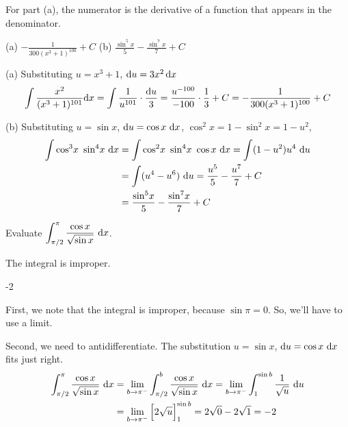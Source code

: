 \begin{hint}
For part (a), the numerator is the derivative of a function that appears
in the denominator.

\end{hint}

\begin{answer}
(a)
$\displaystyle-\frac{1}{300(x^3+1)^{100}} + C$
\qquad (b)
$\displaystyle\frac{\sin^5\!x}{5}-\frac{\sin^7\!x}{7}+C$

\end{answer}

\begin{solution}
(a)
Substituting $u=x^3+1$, $\mathrm{d}u=3x^2\,\mathrm{d}x$
\begin{equation*}
\int\frac{x^2}{(x^3 + 1)^{101}}\mathrm{d}x
=\int\frac{1}{u^{101}}\cdot \frac{\mathrm{d}u}{3}
=\frac{u^{-100}}{-100}\cdot\frac{1}{3}+C
=-\frac{1}{300(x^3+1)^{100}} + C
\end{equation*}

\noindent (b)
Substituting $u=\sin x$,  $\mathrm{d}u=\cos x\ \mathrm{d}x$,
$\cos^2 x = 1-\sin^2 x = 1-u^2$,
\begin{align*}
\int \cos^3\!x\ \sin^4\!x\ \mathrm{d}x
&=\int \cos^2\!x\ \sin^4\!x\ \cos x\ \mathrm{d}x
=\int (1-u^2) u^4\ \mathrm{d}u\\
&=\int (u^4-u^6)\ \mathrm{d}u
=\frac{u^5}{5}-\frac{u^7}{7}+C \\
&=\frac{\sin^5\!x}{5}-\frac{\sin^7\!x}{7}+C
\end{align*}
\end{solution}

\begin{question}
Evaluate $\displaystyle\int_{\pi/2}^\pi \frac{\cos x}{\sqrt{\sin x}}~\mathrm{d}x$.
\end{question}
\begin{hint}
The integral is improper.
\end{hint}
\begin{answer}
-2
\end{answer}
\begin{solution}
First, we note that the integral is improper, because $\sin\pi=0$. So, we'll have to use a limit.

Second, we need to antidifferentiate. The substitution $u=\sin x$, $\mathrm{d}u=\cos x~\mathrm{d}x$ fits just right.
\begin{align*}
\int_{\pi/2}^\pi \frac{\cos x}{\sqrt{\sin x}}~\mathrm{d}x&=\lim_{b \to \pi^-}\int_{\pi/2}^b \frac{\cos x}{\sqrt{\sin x}}~\mathrm{d}x =
\lim_{b \to \pi^-}\int_{1}^{\sin b} \frac{1}{\sqrt{u}}~\mathrm{d}u \\
&=\lim_{b \to \pi^-}\Big[2\sqrt{u}\Big]_{1}^{\sin b}  = 2\sqrt{0} - 2\sqrt{1}=-2
\end{align*}
\end{solution}



